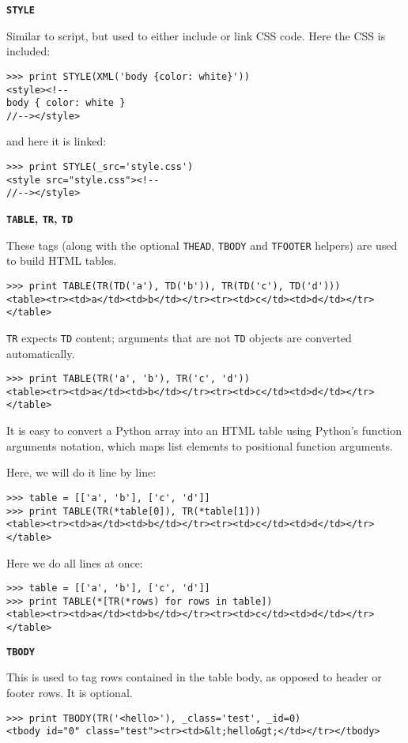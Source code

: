 \documentclass[justified,sixbynine,notoc]{tufte-book}
\def\ft{\small\tt}
\def\inxx#1{\index{#1}}
\begin{document}
\begin{fullwidth}
{\bf {\ft STYLE}}

\inxx{STYLE}

Similar to script, but used to either include or link CSS code.
Here the CSS is included:
\begin{lstlisting}
>>> print STYLE(XML('body {color: white}'))
<style><!--
body { color: white }
//--></style>
\end{lstlisting}
\noindent and here it is linked:
\begin{lstlisting}
>>> print STYLE(_src='style.css')
<style src="style.css"><!--
//--></style>
\end{lstlisting}

{\bf {\ft TABLE}, {\ft TR}, {\ft TD}}

\inxx{TABLE} \inxx{TR} \inxx{TD}

These tags (along with the optional {\ft THEAD}, {\ft TBODY} and {\ft TFOOTER} helpers) are used to build HTML tables.
\begin{lstlisting}
>>> print TABLE(TR(TD('a'), TD('b')), TR(TD('c'), TD('d')))
<table><tr><td>a</td><td>b</td></tr><tr><td>c</td><td>d</td></tr></table>
\end{lstlisting}
{\ft TR} expects {\ft TD} content; arguments that are not {\ft TD} objects are converted automatically.
\begin{lstlisting}
>>> print TABLE(TR('a', 'b'), TR('c', 'd'))
<table><tr><td>a</td><td>b</td></tr><tr><td>c</td><td>d</td></tr></table>
\end{lstlisting}

It is easy to convert a Python array into an HTML table using Python's {\ft *} function arguments notation, which maps list elements to positional function arguments.

Here, we will do it line by line:
\begin{lstlisting}
>>> table = [['a', 'b'], ['c', 'd']]
>>> print TABLE(TR(*table[0]), TR(*table[1]))
<table><tr><td>a</td><td>b</td></tr><tr><td>c</td><td>d</td></tr></table>
\end{lstlisting}

Here we do all lines at once:
\begin{lstlisting}
>>> table = [['a', 'b'], ['c', 'd']]
>>> print TABLE(*[TR(*rows) for rows in table])
<table><tr><td>a</td><td>b</td></tr><tr><td>c</td><td>d</td></tr></table>
\end{lstlisting}

{\bf {\ft TBODY}}

\inxx{TBODY}

This is used to tag rows contained in the table body, as opposed to header or footer rows. It is optional.
\begin{lstlisting}
>>> print TBODY(TR('<hello>'), _class='test', _id=0)
<tbody id="0" class="test"><tr><td>&lt;hello&gt;</td></tr></tbody>
\end{lstlisting}


\end{fullwidth}
\end{document}
